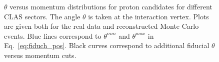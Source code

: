 \begin{figure}[htp]
\begin{center}
\caption{\small $\theta$ versus momentum distributions for proton candidates for different CLAS sectors. The angle $\theta$ is taken at the interaction vertex. Plots are given both for the real data and reconstructed Monte Carlo events. Blue lines correspond to $\theta^{min}$ and $\theta^{max}$ in Eq.~\eqref{eq:fiduch_pos}. Black curves correspond to additional fiducial $\theta$ versus momentum cuts. \label{fig:th_vs_p_pr}}
\end{center}
\end{figure}

\clearpage

